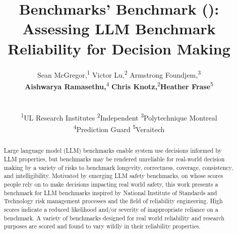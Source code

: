 \documentclass{article}
\title{Benchmarks' Benchmark (\texorpdfstring{\bb}{B2}): Assessing LLM Benchmark Reliability for Decision Making}
\author{%
  Sean McGregor,\textsuperscript{1}
  Victor Lu,\textsuperscript{2}
  Armstrong Foundjem,\textsuperscript{3}\\
  \textbf{Aishwarya Ramasethu,}\textsuperscript{4}
  \textbf{Chris Knotz,}\textsuperscript{2}\textbf{Heather Frase}\textsuperscript{5}\\
   \\
  \\
  \textsuperscript{1}UL Research Institutes \textsuperscript{2}Independent
\textsuperscript{3}Polytechnique Montreal
\\
\textsuperscript{4}Prediction Guard
\textsuperscript{5}Veraitech
}
\begin{document}
\maketitle

\begin{abstract}
Large language model (LLM) benchmarks enable system use decisions informed by LLM properties, but benchmarks may be rendered unreliable for real-world decision making by a variety of risks to benchmark longevity, correctness, coverage, consistency, and intelligibility. Motivated by emerging LLM safety benchmarks, on whose scores people rely on to make decisions impacting real world safety, this work presents a benchmark for LLM benchmarks inspired by National Institute of Standards and Technology risk management processes and the field of reliability engineering. High scores indicate a reduced likelihood and/or severity of inappropriate reliance on a benchmark. A variety of benchmarks designed for real world reliability and research purposes are scored and found to vary wildly in their reliability properties.
\end{abstract}





\end{document}
